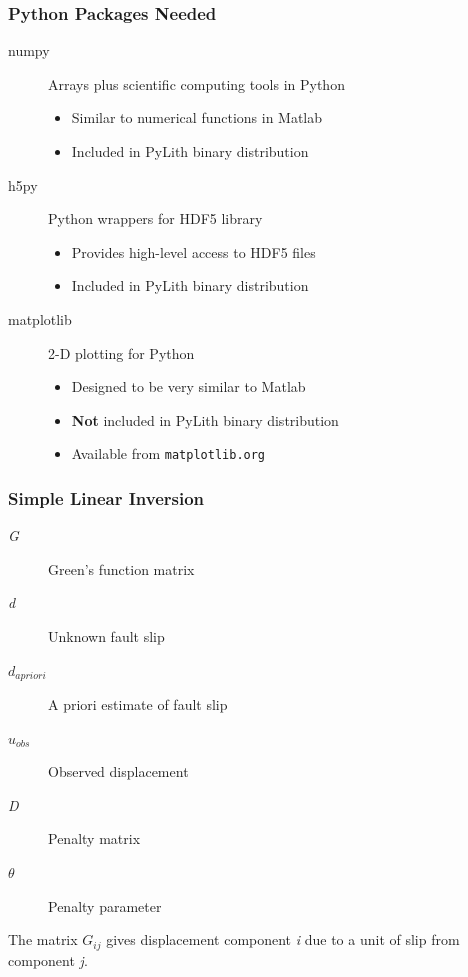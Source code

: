 \documentclass{beamer}
\begin{document}
\begin{frame}
  \frametitle{Python Packages Needed}
  \summary{}

  \begin{description}
  \item[numpy] Arrays plus scientific computing tools in Python
    \begin{itemize}
    \item Similar to numerical functions in Matlab
    \item Included in PyLith binary distribution
    \end{itemize}
  \item[h5py] Python wrappers for HDF5 library
    \begin{itemize}
    \item Provides high-level access to HDF5 files
    \item Included in PyLith binary distribution
    \end{itemize}
  \item[matplotlib] 2-D plotting for Python
    \begin{itemize}
    \item Designed to be very similar to Matlab
    \item {\bf Not} included in PyLith binary distribution
    \item Available from {\tt matplotlib.org}
    \end{itemize}
  \end{description}
  
\end{frame}


\begin{frame}
  \frametitle{Simple Linear Inversion}

  \begin{description}
  \item[\textit{G}] Green's function matrix
  \item[\textit{d}] Unknown fault slip
  \item[\begin{math}d_{apriori}\end{math}] A priori estimate of fault slip
  \item[\begin{math}u_{obs}\end{math}] Observed displacement
  \item[\textit{D}] Penalty matrix
  \item[\begin{math}\theta\end{math}] Penalty parameter
  \end{description}
  
  \vfill
  The matrix \begin{math}{G_{ij}}\end{math} gives displacement component \textit{i} due to a unit of slip from component \textit{j}.
  \vfill

\end{frame}
\end{document}
